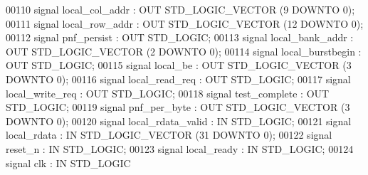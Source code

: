 \begin{DoxyCode}
{00110         \textcolor{keywordflow}{signal} local_col_addr : \textcolor{keywordflow}{OUT} \textcolor{comment}{STD\_LOGIC\_VECTOR} (\textcolor{vhdllogic}{}\textcolor{vhdllogic}{9} \textcolor{keywordflow}{DOWNTO} \textcolor{vhdllogic}{}\textcolor{vhdllogic}{0});
00111         \textcolor{keywordflow}{signal} local_row_addr : \textcolor{keywordflow}{OUT} \textcolor{comment}{STD\_LOGIC\_VECTOR} (\textcolor{vhdllogic}{}\textcolor{vhdllogic}{12} \textcolor{keywordflow}{DOWNTO} \textcolor{vhdllogic}{}\textcolor{vhdllogic}{0});
00112         \textcolor{keywordflow}{signal} pnf_persist : \textcolor{keywordflow}{OUT} \textcolor{comment}{STD\_LOGIC};
00113         \textcolor{keywordflow}{signal} local_bank_addr : \textcolor{keywordflow}{OUT} \textcolor{comment}{STD\_LOGIC\_VECTOR} (\textcolor{vhdllogic}{}\textcolor{vhdllogic}{2} \textcolor{keywordflow}{DOWNTO} \textcolor{vhdllogic}{}\textcolor{vhdllogic}{0});
00114         \textcolor{keywordflow}{signal} local_burstbegin : \textcolor{keywordflow}{OUT} \textcolor{comment}{STD\_LOGIC};
00115         \textcolor{keywordflow}{signal} local_be : \textcolor{keywordflow}{OUT} \textcolor{comment}{STD\_LOGIC\_VECTOR} (\textcolor{vhdllogic}{}\textcolor{vhdllogic}{3} \textcolor{keywordflow}{DOWNTO} \textcolor{vhdllogic}{}\textcolor{vhdllogic}{0});
00116         \textcolor{keywordflow}{signal} local_read_req : \textcolor{keywordflow}{OUT} \textcolor{comment}{STD\_LOGIC};
00117         \textcolor{keywordflow}{signal} local_write_req : \textcolor{keywordflow}{OUT} \textcolor{comment}{STD\_LOGIC};
00118         \textcolor{keywordflow}{signal} test_complete : \textcolor{keywordflow}{OUT} \textcolor{comment}{STD\_LOGIC};
00119         \textcolor{keywordflow}{signal} pnf_per_byte : \textcolor{keywordflow}{OUT} \textcolor{comment}{STD\_LOGIC\_VECTOR} (\textcolor{vhdllogic}{}\textcolor{vhdllogic}{3} \textcolor{keywordflow}{DOWNTO} \textcolor{vhdllogic}{}\textcolor{vhdllogic}{0});
00120         \textcolor{keywordflow}{signal} local_rdata_valid : \textcolor{keywordflow}{IN} \textcolor{comment}{STD\_LOGIC};
00121         \textcolor{keywordflow}{signal} local_rdata : \textcolor{keywordflow}{IN} \textcolor{comment}{STD\_LOGIC\_VECTOR} (\textcolor{vhdllogic}{}\textcolor{vhdllogic}{31} \textcolor{keywordflow}{DOWNTO} \textcolor{vhdllogic}{}\textcolor{vhdllogic}{0});
00122         \textcolor{keywordflow}{signal} reset_n : \textcolor{keywordflow}{IN} \textcolor{comment}{STD\_LOGIC};
00123         \textcolor{keywordflow}{signal} local_ready : \textcolor{keywordflow}{IN} \textcolor{comment}{STD\_LOGIC};
00124         \textcolor{keywordflow}{signal} clk : \textcolor{keywordflow}{IN} \textcolor{comment}{STD\_LOGIC}
}
\end{DoxyCode}
